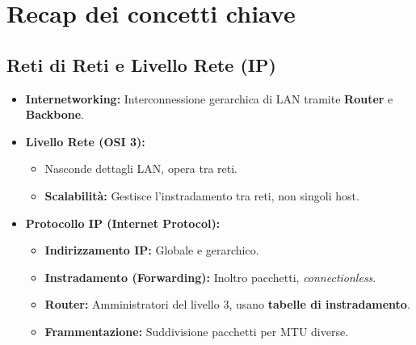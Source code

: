 \section{Recap dei concetti chiave}

\subsection{Reti di Reti e Livello Rete (IP)}
\begin{itemize}
    \item \textbf{Internetworking:} Interconnessione gerarchica di LAN tramite \textbf{Router} e \textbf{Backbone}.
    \item \textbf{Livello Rete (OSI 3):}
        \begin{itemize}
            \item Nasconde dettagli LAN, opera tra reti.
            \item \textbf{Scalabilità:} Gestisce l'instradamento tra reti, non singoli host.
        \end{itemize}
    \item \textbf{Protocollo IP (Internet Protocol):}
        \begin{itemize}
            \item \textbf{Indirizzamento IP:} Globale e gerarchico.
            \item \textbf{Instradamento (Forwarding):} Inoltro pacchetti, \textit{connectionless}.
            \item \textbf{Router:} Amministratori del livello 3, usano \textbf{tabelle di instradamento}.
            \item \textbf{Frammentazione:} Suddivisione pacchetti per MTU diverse.
        \end{itemize}
\end{itemize}

